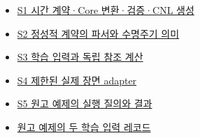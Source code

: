 \documentclass[11pt,a4paper]{article}
\begin{document}
\begin{itemize}
\item \href{\detokenize{../../../../../../projects/04-guardsynth-coc/experiments/paper1_cnl_learning/temporal_preservation.py}}{S1 시간 계약·Core 변환·검증·CNL 생성}
\item \href{\detokenize{../../../../../../platforms/eblc-bcv/src/guard_synth_eblc/action_contract.py}}{S2 정성적 계약의 파서와 수명주기 의미}
\item \href{\detokenize{../../../../../../projects/04-guardsynth-coc/experiments/paper1_cnl_learning/temporal_training_data.py}}{S3 학습 입력과 독립 참조 계산}
\item \href{\detokenize{../../../../../../projects/04-guardsynth-coc/src/guard_synth/qualitative_scene_contract.py}}{S4 제한된 실제 장면 adapter}
\item \href{\detokenize{manuscript_examples.json}}{S5 원고 예제의 실행 질의와 결과}
\item \href{\detokenize{learning_input_examples.json}}{원고 예제의 두 학습 입력 레코드}
\end{itemize}
\end{document}
